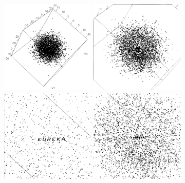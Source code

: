 \documentclass[
  letterpaper,
  10pt,
  krantz2]{krantz}
\begin{document}
\begin{figure}

\begin{minipage}{0.50\linewidth}
\includegraphics[width=0.4\textwidth,height=\textheight]{images/pollen-eureka1.png}\end{minipage}%
%
\begin{minipage}{0.50\linewidth}
\includegraphics[width=0.4\textwidth,height=\textheight]{images/pollen-eureka2.png}\end{minipage}%
\newline
\begin{minipage}{0.50\linewidth}
\includegraphics[width=0.4\textwidth,height=\textheight]{images/pollen-eureka4.png}\end{minipage}%
%
\begin{minipage}{0.50\linewidth}
\includegraphics[width=0.4\textwidth,height=\textheight]{images/pollen-eureka3.png}\end{minipage}%


\end{figure}
\end{document}
